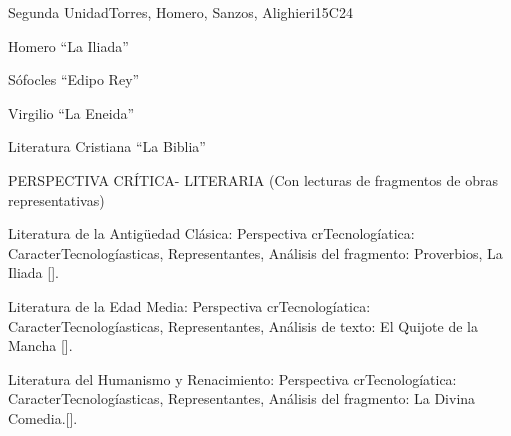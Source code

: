 \begin{syllabus}
\begin{unit}{}{Segunda Unidad}{Torres, Homero, Sanzos, Alighieri}{15}{C24}
\begin{topics}
	\item Homero ``La Iliada''
	\item Sófocles ``Edipo Rey''
	\item Virgilio ``La Eneida''
	\item Literatura Cristiana ``La Biblia''
\end{topics}
\begin{learningoutcomes}
	PERSPECTIVA CRÍTICA- LITERARIA
(Con lecturas de fragmentos de obras representativas)
	\item Literatura de la Antigüedad Clásica: Perspectiva crTecnologíatica: CaracterTecnologíasticas, Representantes, Análisis del fragmento: Proverbios, La Iliada [\Usage].
	\item Literatura de la Edad Media: Perspectiva crTecnologíatica: CaracterTecnologíasticas, Representantes, Análisis de texto: El Quijote de la Mancha [\Usage].
	\item Literatura del Humanismo y Renacimiento: Perspectiva crTecnologíatica: CaracterTecnologíasticas, Representantes, Análisis del fragmento: La Divina Comedia.[\Usage].
\end{learningoutcomes}
\end{unit}


\end{syllabus}
